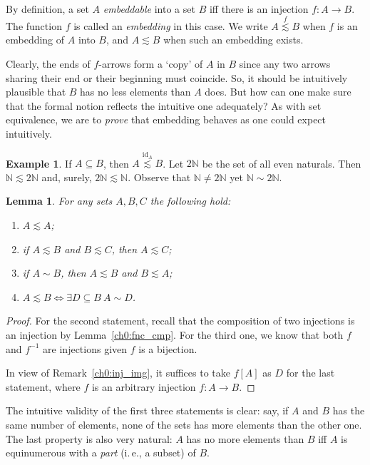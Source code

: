 \documentclass[12pt,notitlepage]{article}
\theoremstyle{plain}
\newtheorem{lemma}[thm]{Lemma}
\theoremstyle{definition}
\newtheorem{exm}[thm]{Example}
\theoremstyle{plain}
\newcommand{\N}{\mathbb{N}}
\newcommand{\sbs}{\subseteq}
\newcommand{\id}{\mathrm{id}}
\newcommand{\1}{\mathbf{1}}
\newcommand{\0}{\mathbf{0}}
\begin{document}
By definition, a set $A$ \emph{embeddable} into a set $B$ iff there is an injection $f\colon A \to B$. The function $f$ is called an \emph{embedding} in this case. We write $A \stackrel{f}{\lesssim} B$ when $f$ is an embedding of $A$ into $B$, and $A \lesssim B$ when such an embedding exists.

Clearly, the ends of $f$-arrows form  a `copy' of $A$ in $B$ since any two arrows sharing their end or their beginning must coincide. So, it should be intuitively plausible that $B$ has no less elements than $A$ does. But how can one make sure that the formal notion reflects the intuitive one adequately? As with set equivalence, we are to \emph{prove} that embedding behaves as one could expect intuitively.

\begin{exm}
If $A \sbs B$, then $A \stackrel{\id_A}{\lesssim} B$. Let $2\N$ be the set of all even naturals. Then $\N \lesssim 2\N$ and, surely, $2\N \lesssim \N$. Observe that $\N \neq 2\N$ yet $\N \sim 2\N$.
\end{exm}

\begin{lemma}\label{L9:l_emb}
For any sets $A, B, C$ the following hold:
\begin{enumerate}
\item $A \lesssim A$;
\item if $A \lesssim B$ and $B \lesssim C$, then $A \lesssim C$;
\item if $A \sim B$, then $A \lesssim B$ and $B \lesssim A$;
\item $A \lesssim B \iff \exists D \sbs B\ A \sim D$.
\end{enumerate}
\end{lemma}
\begin{proof}
For the second statement, recall that the composition of two injections is an injection by Lemma~\ref{ch0:fnc_cmp}. For the third one, we know that both $f$ and $f^{-1}$ are injections given $f$ is a bijection.

In view of Remark~\ref{ch0:inj_img}, it suffices to take $f[A]$ as $D$ for the last statement, where $f$ is an arbitrary injection $f\colon A \to B$.
\end{proof}
The intuitive validity of the first three statements is clear: say, if $A$ and $B$ has the same number of elements, none of the sets has more elements than the other one. The last property is also very natural: $A$ has no more elements than $B$ iff $A$ is equinumerous with a \emph{part} (i.\,e., a subset) of $B$.
\end{document}
